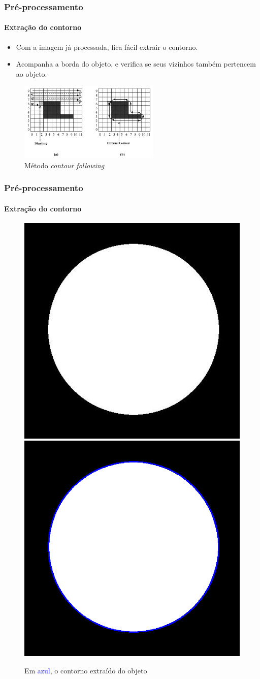 \documentclass{beamer}
\begin{document}
    \begin{frame}
      \frametitle{Pré-processamento}
      \framesubtitle{Extração do contorno}
    
        \begin{itemize}
          \item Com a imagem já processada, fica fácil extrair o contorno.
          \item Acompanha a borda do objeto, e verifica se seus vizinhos também pertencem ao objeto.
        \end{itemize}
        
        \begin{figure}[hbt]
          \begin{center}
          \caption{Método \textit{contour following}~\cite{book_shape}}
          \includegraphics[width=0.6\textwidth]{img/contorno.png}
          \end{center}
        \end{figure}
    \end{frame}
    
    \begin{frame}
      \frametitle{Pré-processamento}
      \framesubtitle{Extração do contorno}
        
        \begin{figure}[hbt]
          \begin{center}
          \caption{Em \textcolor{blue}{azul}, o contorno extraído do objeto}
            \includegraphics[width=0.35\linewidth]{img/ball/05-dilate.jpg}
            \quad
            \includegraphics[width=0.35\linewidth]{img/ball/06-borda.png}
          \end{center}
        \end{figure}
        
    \end{frame}
    
\end{document}
